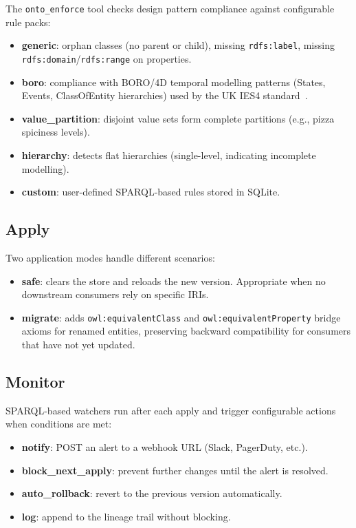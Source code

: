 \documentclass[runningheads]{llncs}
\begin{document}
The \texttt{onto\_enforce} tool checks design pattern compliance against configurable rule packs:

\begin{itemize}
    \item \textbf{generic}: orphan classes (no parent or child), missing \texttt{rdfs:label}, missing \texttt{rdfs:domain}/\texttt{rdfs:range} on properties.
    \item \textbf{boro}: compliance with BORO/4D temporal modelling patterns (States, Events, ClassOfEntity hierarchies) used by the UK IES4 standard~\cite{ies4}.
    \item \textbf{value\_partition}: disjoint value sets form complete partitions (e.g., pizza spiciness levels).
    \item \textbf{hierarchy}: detects flat hierarchies (single-level, indicating incomplete modelling).
    \item \textbf{custom}: user-defined SPARQL-based rules stored in SQLite.
\end{itemize}

\subsection{Apply}
\label{sec:apply}

Two application modes handle different scenarios:

\begin{itemize}
    \item \textbf{safe}: clears the store and reloads the new version. Appropriate when no downstream consumers rely on specific IRIs.
    \item \textbf{migrate}: adds \texttt{owl:equivalentClass} and \texttt{owl:equivalentProperty} bridge axioms for renamed entities, preserving backward compatibility for consumers that have not yet updated.
\end{itemize}

\subsection{Monitor}
\label{sec:monitor}

SPARQL-based watchers run after each apply and trigger configurable actions when conditions are met:

\begin{itemize}
    \item \textbf{notify}: POST an alert to a webhook URL (Slack, PagerDuty, etc.).
    \item \textbf{block\_next\_apply}: prevent further changes until the alert is resolved.
    \item \textbf{auto\_rollback}: revert to the previous version automatically.
    \item \textbf{log}: append to the lineage trail without blocking.
\end{itemize}
\end{document}
